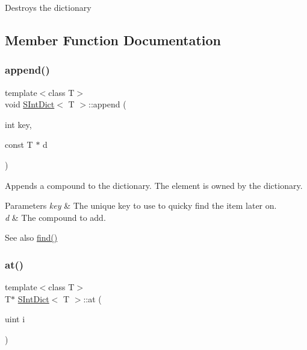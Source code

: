 Destroys the dictionary 

\subsection{Member Function Documentation}
\mbox{\label{class_s_int_dict_a829c9e4c9827e765145d150ffb18b1ae}} 
\subsubsection{\texorpdfstring{append()}{append()}}
{\footnotesize\ttfamily template$<$class T$>$ \\
void \mbox{\hyperlink{class_s_int_dict}{S\+Int\+Dict}}$<$ T $>$\+::append (\begin{DoxyParamCaption}\item[{int}]{key,  }\item[{const T $\ast$}]{d }\end{DoxyParamCaption})\hspace{0.3cm}{\ttfamily [inline]}}

Appends a compound to the dictionary. The element is owned by the dictionary. 
\begin{DoxyParams}{Parameters}
{\em key} & The unique key to use to quicky find the item later on. \\
\hline
{\em d} & The compound to add. \\
\hline
\end{DoxyParams}
\begin{DoxySeeAlso}{See also}
\mbox{\hyperlink{class_s_int_dict_a5b08deebe24072f66bdce4fed2a3863d}{find()}} 
\end{DoxySeeAlso}
\mbox{\label{class_s_int_dict_a13bbde7f8fdac65c32e670d627fbdeac}} 
\subsubsection{\texorpdfstring{at()}{at()}}
{\footnotesize\ttfamily template$<$class T$>$ \\
T$\ast$ \mbox{\hyperlink{class_s_int_dict}{S\+Int\+Dict}}$<$ T $>$\+::at (\begin{DoxyParamCaption}\item[{uint}]{i }\end{DoxyParamCaption})\hspace{0.3cm}{\ttfamily [inline]}}

